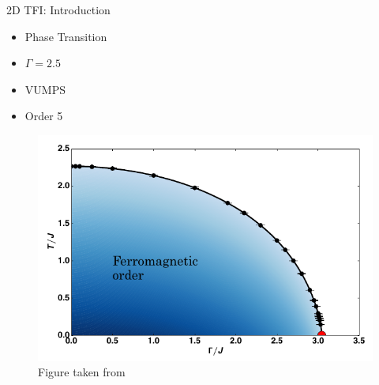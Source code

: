 \begin{frame}{2D TFI: Introduction}
    \begin{minipage}{0.35\textwidth}
        \begin{itemize}
            \item Phase Transition


            \item $\Gamma=2.5$
            \item VUMPS
            \item Order 5
        \end{itemize}
    \end{minipage}
    \begin{minipage}{0.64\textwidth}
        \begin{figure}
            \centering
            \includegraphics[width=\linewidth]{../Figuren/phsyics/2disingphase.png}
            \caption*{Figure taken from \cite{Hesselmann2016}  }
        \end{figure}
    \end{minipage}
\end{frame}

